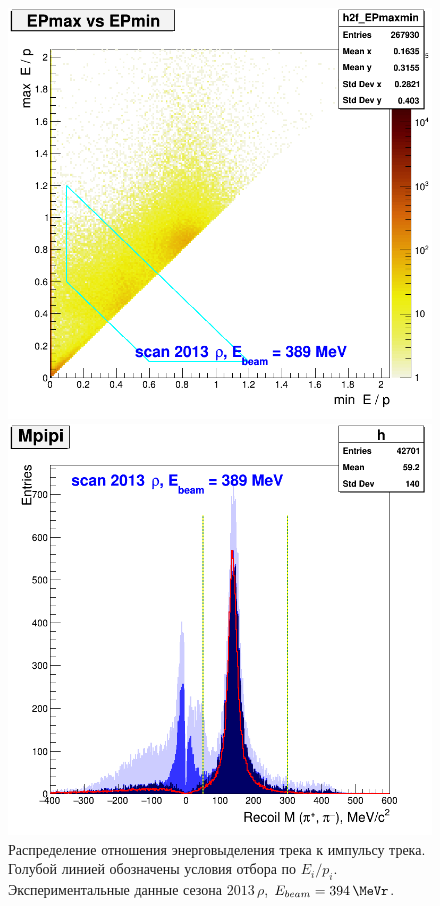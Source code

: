 \begin{figure}
    \begin{minipage}[t]{0.45\textwidth}
        \includegraphics[width=\textwidth]{img/h2f_EPmaxmin_zoom.png}
        \caption{Распределение отношения энерговыделения трека к импульсу трека.
            Голубой линией обозначены условия отбора по $E_i / p_i$.
            Экспериментальные данные сезона $2013 \, \rho$, $E_{beam} = \SI{394}{\MeVr}$.}
        \label{fig:EPmaxmin_zoom}
    \end{minipage}
    \qquad
    \begin{minipage}[t]{0.45\textwidth}
        \includegraphics[width=\textwidth]{img/mpipi.png}

\end{minipage}
\end{figure}

